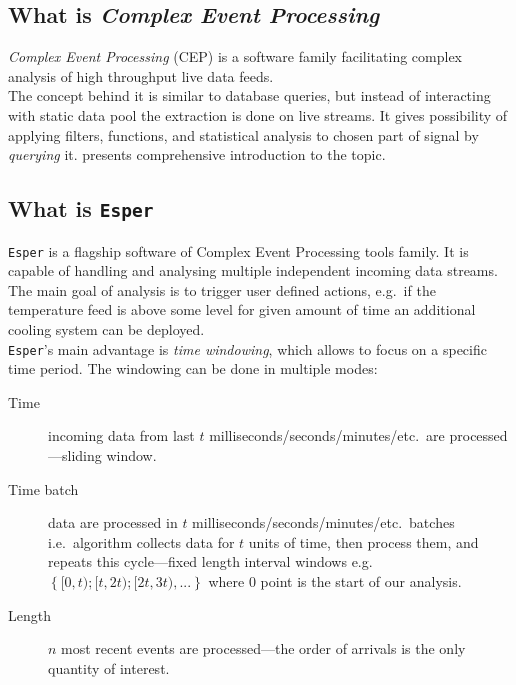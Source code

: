 \documentclass[11pt, letterpaper]{article}            %
\begin{document}

\subsection{What is \emph{Complex Event Processing}}
\emph{Complex Event Processing} (CEP) is a software family facilitating complex analysis of high throughput live data feeds.\\
The concept behind it is similar to database queries, but instead of interacting with static data pool the extraction is done on live streams. It gives possibility of applying filters, functions, and statistical analysis to chosen part of signal by \emph{querying} it. \citep{Etzion:2010:EPA:1894960} presents comprehensive introduction to the topic.

\subsection{What is \texttt{Esper}}
\texttt{Esper} is a flagship software of Complex Event Processing tools family. It is capable of handling and analysing multiple independent incoming data streams. The main goal of analysis is to trigger user defined actions, e.g.\ if the temperature feed is above some level for given amount of time an additional cooling system can be deployed.\\

\texttt{Esper}'s main advantage is \emph{time windowing}, which allows to focus on a specific time period. The windowing can be done in multiple modes:
\begin{description}
    \item[Time] incoming data from last $t$ milliseconds/seconds/minutes/etc.\ are processed---sliding window.
    \item[Time batch] data are processed in $t$ milliseconds/seconds/minutes/etc.\ batches i.e.\ algorithm collects data for $t$ units of time, then process them, and repeats this cycle---fixed length interval windows e.g.\ $\left\{ [0, t); [t, 2t); [2t, 3t), ...\right\}$ where $0$ point is the start of our analysis.
    \item[Length] $n$ most recent events are processed---the order of arrivals is the only quantity of interest.
\end{description}
\end{document}
